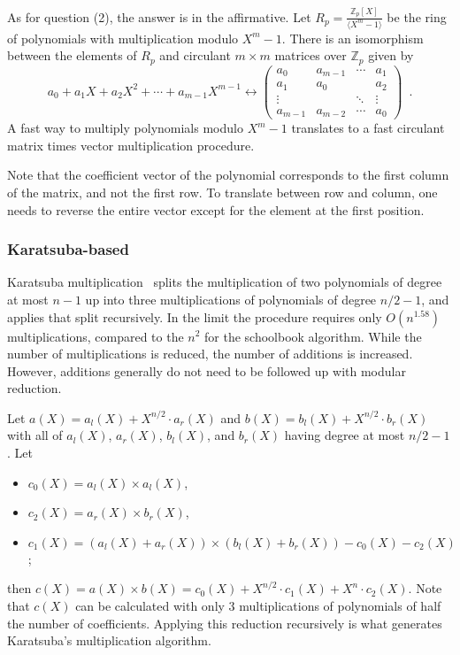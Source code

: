 \documentclass[a4paper]{article}
\begin{document}
As for question (2), the answer is in the affirmative. Let $R_p = \frac{\mathbb{Z}_p[X]}{\langle X^m - 1\rangle}$ be the ring of polynomials with multiplication modulo $X^m - 1$. There is an isomorphism between the elements of $R_p$ and circulant $m \times m$ matrices over $\mathbb{Z}_p$ given by
\begin{equation}
a_0 + a_1 X + a_2 X^2 + \cdots + a_{m-1} X^{m-1} \leftrightarrow \left( \begin{matrix}
a_0 & a_{m-1} & \cdots & a_1 \\
a_1 & a_0 & & a_2 \\
\vdots & & \ddots & \vdots \\
a_{m-1} & a_{m-2} & \cdots & a_0
\end{matrix} \right) \enspace .
\end{equation}
A fast way to multiply polynomials modulo $X^m - 1$ translates to a fast circulant matrix times vector multiplication procedure.

Note that the coefficient vector of the polynomial corresponds to the first column of the matrix, and not the first row. To translate between row and column, one needs to reverse the entire vector except for the element at the first position.

\subsubsection{Karatsuba-based}

Karatsuba multiplication~\cite{karatsuba1962multiplication} splits the multiplication of two polynomials of degree at most $n-1$ up into three multiplications of polynomials of degree $n/2 - 1$, and applies that split recursively. In the limit the procedure requires only $O(n^{1.58})$ multiplications, compared to the $n^2$ for the schoolbook algorithm. While the number of multiplications is reduced, the number of additions is increased. However, additions generally do not need to be followed up with modular reduction.

Let $a(X) = a_l(X) + X^{n/2} \cdot a_r(X)$ and $b(X) = b_l(X) + X^{n/2} \cdot b_r(X)$ with all of $a_l(X)$, $a_r(X)$, $b_l(X)$, and $b_r(X)$ having degree at most $n/2-1$. Let
\begin{itemize}
\item $c_0(X) = a_l(X) \times a_l(X)$,
\item $c_2(X) = a_r(X) \times b_r(X)$,
\item $c_1(X) = (a_l(X) + a_r(X)) \times (b_l(X) + b_r(X)) - c_0(X) - c_2(X)$;
\end{itemize}
then $c(X) = a(X) \times b(X) = c_0(X) + X^{n/2} \cdot c_1(X) + X^n \cdot c_2(X)$. Note that $c(X)$ can be calculated with only $3$ multiplications of polynomials of half the number of coefficients. Applying this reduction recursively is what generates Karatsuba's multiplication algorithm.
\end{document}
